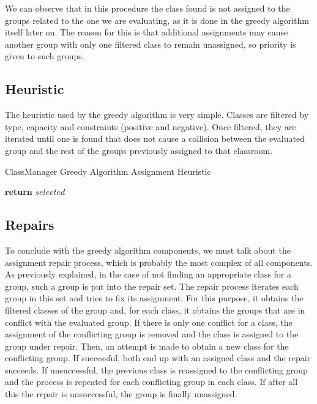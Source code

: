 We can observe that in this procedure the class found is not assigned to the groups related to the one we are evaluating, as it is done in the greedy algorithm itself later on. The reason for this is that additional assignments may cause another group with only one filtered class to remain unassigned, so priority is given to such groups.


\subsection{Heuristic}

The heuristic used by the greedy algorithm is very simple. Classes are filtered by type, capacity and constraints (positive and negative). Once filtered, they are iterated until one is found that does not cause a collision between the evaluated group and the rest of the groups previously assigned to that classroom.

\begin{algorithm}[H]
    \caption{ClassManager Greedy Algorithm Assignment Heuristic}
    \begin{algorithmic}[1]
                 
                \EndIf
            \EndFor
            \State \textbf{return} $selected$
        \EndProcedure
    \end{algorithmic}
\end{algorithm}


\subsection{Repairs}

To conclude with the greedy algorithm components, we must talk about the assignment repair process, which is probably the most complex of all components. As previously explained, in the case of not finding an appropriate class for a group, such a group is put into the repair set. The repair process iterates each group in this set and tries to fix its assignment. For this purpose, it obtains the filtered classes of the group and, for each class, it obtains the groups that are in conflict with the evaluated group. If there is only one conflict for a class, the assignment of the conflicting group is removed and the class is assigned to the group under repair. Then, an attempt is made to obtain a new class for the conflicting group. If successful, both end up with an assigned class and the repair succeeds. If unsuccessful, the previous class is reassigned to the conflicting group and the process is repeated for each conflicting group in each class. If after all this the repair is unsuccessful, the group is finally unassigned.

